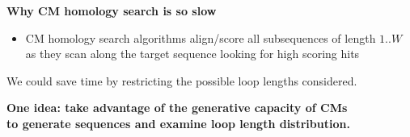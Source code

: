 \documentclass[landscape]{slides}
\begin{document}
\begin{slide}
\begin{center}
\textbf{Why CM homology search is so slow}
\end{center}

\medskip
\small
\begin{itemize}

\item
CM homology search algorithms align/score all subsequences of length
$1..W$ \\ as they scan along the target sequence
looking for high scoring hits
\end{itemize}


  We could save time by restricting the possible loop lengths
  considered.

  {\bf One idea: take advantage of the generative capacity of CMs \\ to generate
  sequences and examine loop length distribution.}

\vfill
\end{slide}
%
\end{document}
